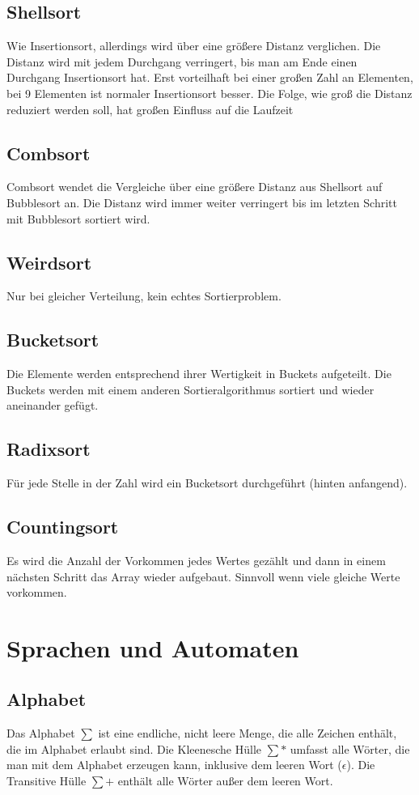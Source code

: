 \documentclass[a4paper]{scrartcl}
\begin{document}
        \subsection{Shellsort}
            Wie Insertionsort, allerdings wird über eine größere Distanz verglichen. Die Distanz wird mit jedem Durchgang verringert, bis man am Ende einen Durchgang Insertionsort hat. Erst vorteilhaft bei einer großen Zahl an Elementen, bei 9 Elementen ist normaler Insertionsort besser. Die Folge, wie groß die Distanz reduziert werden soll, hat großen Einfluss auf die Laufzeit
        \subsection{Combsort}
            Combsort wendet die Vergleiche über eine größere Distanz aus Shellsort auf Bubblesort an. Die Distanz wird immer weiter verringert bis im letzten Schritt mit Bubblesort sortiert wird.
        \subsection{Weirdsort}
            Nur bei gleicher Verteilung, kein echtes Sortierproblem.
        \subsection{Bucketsort}
            Die Elemente werden entsprechend ihrer Wertigkeit in Buckets aufgeteilt. Die Buckets werden mit einem anderen Sortieralgorithmus sortiert und wieder aneinander gefügt.
        \subsection{Radixsort}
            Für jede Stelle in der Zahl wird ein Bucketsort durchgeführt (hinten anfangend).
        \subsection{Countingsort}
            Es wird die Anzahl der Vorkommen jedes Wertes gezählt und dann in einem nächsten Schritt das Array wieder aufgebaut. Sinnvoll wenn viele gleiche Werte vorkommen.
    \section{Sprachen und Automaten}
        \subsection{Alphabet}
            Das Alphabet $\sum$ ist eine endliche, nicht leere Menge, die alle Zeichen enthält, die im Alphabet erlaubt sind. Die Kleenesche Hülle $\sum*$ umfasst alle Wörter, die man mit dem Alphabet erzeugen kann, inklusive dem leeren Wort ($\epsilon$). Die Transitive Hülle $\sum+$ enthält alle Wörter außer dem leeren Wort.
\end{document}
